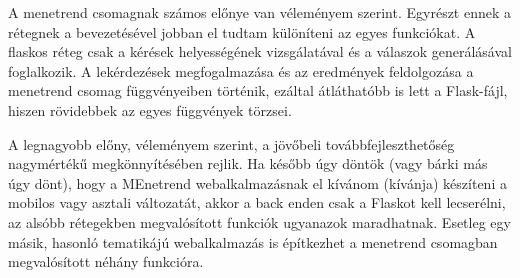 A menetrend csomagnak számos előnye van véleményem szerint. Egyrészt ennek a rétegnek a bevezetésével jobban el tudtam különíteni az egyes funkciókat. A flaskos réteg csak a kérések helyességének vizsgálatával és a válaszok generálásával foglalkozik. A lekérdezések megfogalmazása és az eredmények feldolgozása a menetrend csomag függvényeiben történik, ezáltal átláthatóbb is lett a Flask-fájl, hiszen rövidebbek az egyes függvények törzsei.

A legnagyobb előny, véleményem szerint, a jövőbeli továbbfejleszthetőség nagymértékű megkönnyítésében rejlik. Ha később úgy döntök (vagy bárki más úgy dönt), hogy a MEnetrend webalkalmazásnak el kívánom (kívánja) készíteni a mobilos vagy asztali változatát, akkor a back enden csak a Flaskot kell lecserélni, az alsóbb rétegekben megvalósított funkciók ugyanazok maradhatnak. Esetleg egy másik, hasonló tematikájú webalkalmazás is építkezhet a menetrend csomagban megvalósított néhány funkcióra.


